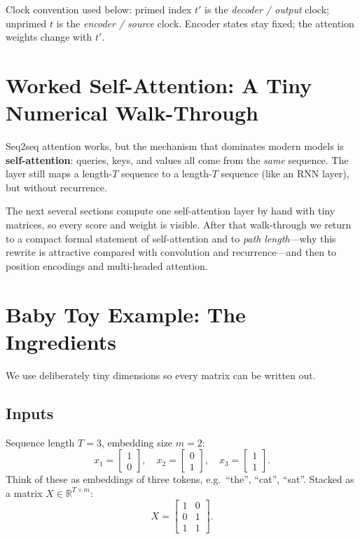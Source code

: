 \documentclass[11pt]{article}
\begin{document}
Clock convention used below: primed index \(t'\) is the \emph{decoder /
output} clock; unprimed \(t\) is the \emph{encoder / source} clock.
Encoder states stay fixed; the attention weights change with \(t'\).

\section{Worked Self-Attention: A Tiny Numerical Walk-Through}

Seq2seq attention works, but the mechanism that dominates modern models is
\textbf{self-attention}: queries, keys, and values all come from the
\emph{same} sequence. The layer still maps a length-\(T\) sequence to a
length-\(T\) sequence (like an RNN layer), but without recurrence.

The next several sections compute one self-attention layer by hand with
tiny matrices, so every score and weight is visible. After that walk-through
we return to a compact formal statement of self-attention and to
\emph{path length}---why this rewrite is attractive compared with
convolution and recurrence---and then to position encodings and
multi-headed attention.

\section{Baby Toy Example: The Ingredients}

We use deliberately tiny dimensions so every matrix can be written out.

\subsection{Inputs}

Sequence length \(T=3\), embedding size \(m=2\):
\[
  x_1 = \begin{bmatrix}1\\0\end{bmatrix},\quad
  x_2 = \begin{bmatrix}0\\1\end{bmatrix},\quad
  x_3 = \begin{bmatrix}1\\1\end{bmatrix}.
\]
Think of these as embeddings of three tokens, e.g.\ ``the'', ``cat'', ``sat''.
Stacked as a matrix \(X \in \mathbb{R}^{T \times m}\):
\[
  X =
  \begin{bmatrix}
    1 & 0 \\
    0 & 1 \\
    1 & 1
  \end{bmatrix}.
\]
\end{document}
